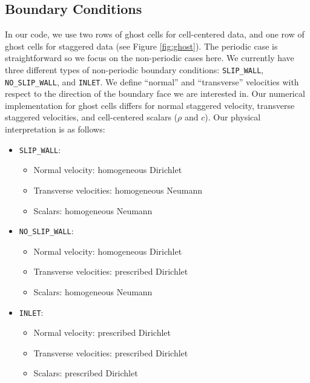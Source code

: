 \documentclass[final]{siamltex}
\begin{document}
\subsection{Boundary Conditions}
In our code, we use two rows of ghost cells for cell-centered data, and one row of ghost cells for staggered data
(see Figure \ref{fig:ghost}).  The periodic case is straightforward so we focus on the non-periodic cases here.
We currently have three different types of non-periodic boundary conditions: 
{\tt SLIP\_WALL}, {\tt NO\_SLIP\_WALL}, and {\tt INLET}.  We define ``normal'' and ``transverse'' 
velocities with respect to the direction of the boundary face we are interested in.
Our numerical implementation for ghost cells differs for 
normal staggered velocity, transverse staggered velocities, and cell-centered scalars ($\rho$ and $c$).
Our physical interpretation is as follows:
\begin{itemize}
\item {\tt SLIP\_WALL}:
\begin{itemize}
\item Normal velocity: homogeneous Dirichlet 
\item Transverse velocities: homogeneous Neumann
\item Scalars: homogeneous Neumann
\end{itemize}
\item {\tt NO\_SLIP\_WALL}:
\begin{itemize}
\item Normal velocity: homogeneous Dirichlet 
\item Transverse velocities: prescribed Dirichlet
\item Scalars: homogeneous Neumann
\end{itemize}
\item {\tt INLET}:
\begin{itemize}
\item Normal velocity: prescribed Dirichlet 
\item Transverse velocities: prescribed Dirichlet
\item Scalars: prescribed Dirichlet
\end{itemize}
\end{itemize}
\end{document}
